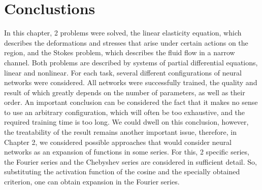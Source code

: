 \section*{Conclustions}
In this chapter, 2 problems were solved, the linear elasticity equation, which describes the deformations and stresses that arise under certain actions on the region, and the Stokes problem, which describes the fluid flow in a narrow channel. Both problems are described by systems of partial differential equations, linear and nonlinear. For each task, several different configurations of neural networks were considered. All networks were successfully trained, the quality and result of which greatly depends on the number of parameters, as well as their order. An important conclusion can be considered the fact that it makes no sense to use an arbitrary configuration, which will often be too exhaustive, and the required training time is too long. We could dwell on this conclusion, however, the treatability of the result remains another important issue, therefore, in Chapter 2, we considered possible approaches that would consider neural networks as an expansion of functions in some series. For this, 2 specific series, the Fourier series and the Chebyshev series are considered in sufficient detail. So, substituting the activation function of the cosine and the specially obtained criterion, one can obtain expansion in the Fourier series.
